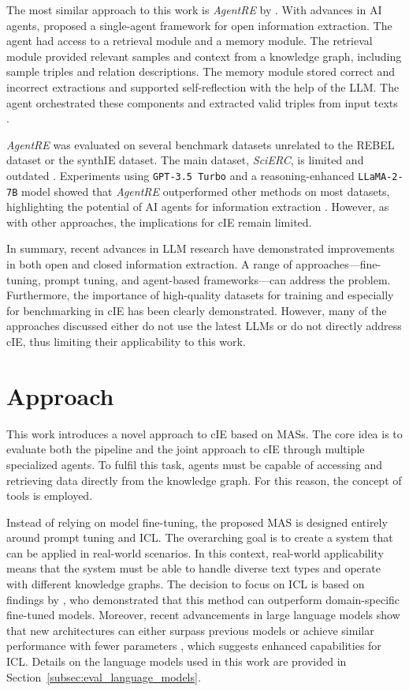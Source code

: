 \documentclass[a4paper,oneside,bibliography=totoc]{scrbook}
\begin{document}
The most similar approach to this work is \textit{AgentRE} by \citet{Shi2024}. With advances in AI agents, \citet{Shi2024} proposed a single-agent framework for open information extraction. The agent had access to a retrieval module and a memory module. The retrieval module provided relevant samples and context from a knowledge graph, including sample triples and relation descriptions. The memory module stored correct and incorrect extractions and supported self-reflection with the help of the \ac{LLM}. The agent orchestrated these components and extracted valid triples from input texts \cite{Shi2024}.

\textit{AgentRE} was evaluated on several benchmark datasets unrelated to the REBEL dataset or the synthIE dataset. The main dataset, \textit{SciERC}, is limited and outdated \cite{Luan2018}. Experiments using \texttt{GPT-3.5 Turbo} and a reasoning-enhanced \texttt{LLaMA-2-7B} model showed that \textit{AgentRE} outperformed other methods on most datasets, highlighting the potential of AI agents for information extraction \cite{Shi2024}. However, as with other approaches, the implications for \ac{cIE} remain limited.

In summary, recent advances in \ac{LLM} research have demonstrated improvements in both open and closed information extraction. A range of approaches—fine-tuning, prompt tuning, and agent-based frameworks—can address the problem. Furthermore, the importance of high-quality datasets for training and especially for benchmarking in \ac{cIE} has been clearly demonstrated. However, many of the approaches discussed either do not use the latest \acp{LLM} or do not directly address \ac{cIE}, thus limiting their applicability to this work.

\chapter{Approach}
\label{ch:approach}

This work introduces a novel approach to \ac{cIE} based on \acp{MAS}. The core idea is to evaluate both the pipeline and the joint approach to \ac{cIE} through multiple specialized agents. To fulfil this task, agents must be capable of accessing and retrieving data directly from the knowledge graph. For this reason, the concept of tools is employed.

Instead of relying on model fine-tuning, the proposed \ac{MAS} is designed entirely around prompt tuning and \ac{ICL}. The overarching goal is to create a system that can be applied in real-world scenarios. In this context, real-world applicability means that the system must be able to handle diverse text types and operate with different knowledge graphs. The decision to focus on \ac{ICL} is based on findings by \citet{Brown2020}, who demonstrated that this method can outperform domain-specific fine-tuned models. Moreover, recent advancements in large language models show that new architectures can either surpass previous models or achieve similar performance with fewer parameters \cite{MetaAI2025,Chiang2024}, which suggests enhanced capabilities for \ac{ICL}. Details on the language models used in this work are provided in Section~\ref{subsec:eval_language_models}.
\end{document}
